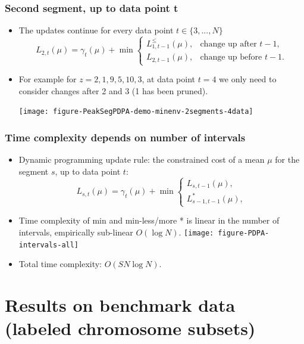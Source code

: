 \documentclass{beamer}
\begin{document}
\begin{frame}
  \frametitle{Second segment, up to data point t}
  \begin{itemize}
  \item The updates continue for every data point $t\in\{3, ..., N\}$
    \begin{equation*}
      L_{2,t}(\mu) =  \gamma_t(\mu) + \min
      \begin{cases}
        L_{1,t-1}^{\leq}(\mu), & \text{change up after $t-1$,}\\
        L_{2,t-1}(\mu), & \text{change up before $t-1$.}
      \end{cases}
    \end{equation*}
  \item For example for $z = 2, 1, 9, 5, 10, 3$, at data point $t=4$
    we only need to consider changes after 2 and 3 (1 has been
    pruned).
    \begin{center}
      \texttt{[image: figure-PeakSegPDPA-demo-minenv-2segments-4data]}
    \end{center}
  \end{itemize}
\end{frame}

\begin{frame}
  \frametitle{Time complexity depends on number of intervals}
  \begin{itemize}
  \item Dynamic programming update rule: the constrained cost of a
    mean $\mu$ for the segment $s$, up to data point $t$:
    \begin{equation*}
      L_{s,t}(\mu) = \gamma_t(\mu) + \min
      \begin{cases}
        L_{s,t-1}(\mu),\\
        L_{s-1,t-1}^{*}(\mu),
      \end{cases}
    \end{equation*}
  \item Time complexity of min and min-less/more * is linear in the
    number of intervals, empirically sub-linear $O(\log N)$.
    \texttt{[image: figure-PDPA-intervals-all]}
  \item Total time complexity: $O(S N\log N)$.
  \end{itemize}
\end{frame}

\section{Results on benchmark data (labeled chromosome subsets)}
\end{document}
